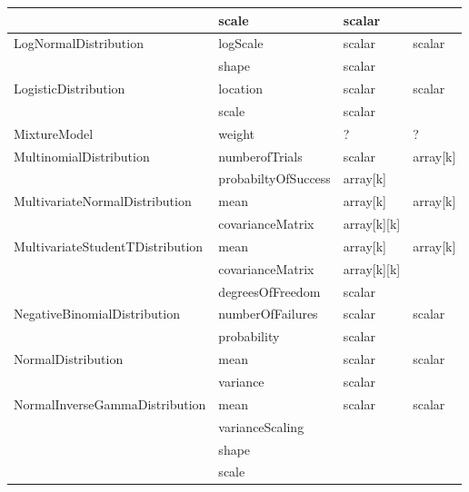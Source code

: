\documentclass[draftspec]{sbmlpkgspec}
\begin{document}
\begin{longtable}[c]{ l l l l }
                                  & scale & scalar & \\\midrule
LogNormalDistribution & logScale & scalar & scalar \\
                                     & shape & scalar & \\\midrule
LogisticDistribution & location & scalar & scalar \\
                                & scale & scalar & \\\midrule
MixtureModel & weight & ? & ? \\\midrule
MultinomialDistribution & numberofTrials & scalar & array[k]\\
                                       & probabiltyOfSuccess &
                                       array[k]\\\midrule
MultivariateNormalDistribution & mean & array[k] & array[k] \\
                                                  & covarianceMatrix & array[k][k] & \\\midrule
MultivariateStudentTDistribution & mean & array[k] & array[k] \\
                                                         & covarianceMatrix & array[k][k]\\
                                                         &
                                                         degreesOfFreedom
                                                         & scalar
                                                         \\\midrule
NegativeBinomialDistribution & numberOfFailures & scalar & scalar \\
                                               & probability & scalar
                                               & \\\midrule
NormalDistribution & mean & scalar & scalar \\
                                & variance & scalar & \\\midrule
NormalInverseGammaDistribution & mean & scalar & scalar\\
                                                       &
                                                       varianceScaling
                                                       & \\
                                                       & shape &\\
                                                       & scale & \\\midrule

\end{longtable}
\end{document}
